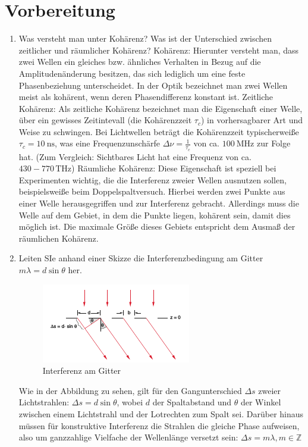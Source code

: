 \section{Vorbereitung}
\begin{enumerate}
	\item Was versteht man unter Kohärenz? Was ist der Unterschied zwischen zeitlicher und räumlicher Kohärenz?
		\subitem Kohärenz: Hierunter versteht man, dass zwei Wellen ein gleiches bzw. ähnliches Verhalten in Bezug auf die Amplitudenänderung besitzen, das sich lediglich um eine feste Phasenbeziehung unterscheidet. In der Optik bezeichnet man zwei Wellen meist als kohärent, wenn deren Phasendifferenz konstant ist.
		\subitem Zeitliche Kohärenz: Als zeitliche Kohärenz bezeichnet man die Eigenschaft einer Welle, über ein gewisses Zeitintevall (die Kohärenzzeit $\tau_c$) in vorhersagbarer Art und Weise zu schwingen. Bei Lichtwellen beträgt die Kohärenzzeit typischerweiße $\tau_c=\SI{10}{\nano\second}$, was eine Frequenzunschärfe $\Delta\nu=\frac{1}{\tau_c}$ von ca. $\SI{100}{\mega\hertz}$ zur Folge hat. (Zum Vergleich: Sichtbares Licht hat eine Frequenz von ca. $430-770\,\si{\tera\hertz}$)
		\subitem Räumliche Kohärenz: Diese Eigenschaft ist speziell bei Experimenten wichtig, die die Interferenz zweier Wellen ausnutzen sollen, beispielsweiße beim Doppelspaltversuch. Hierbei werden zwei Punkte aus einer Welle herausgegriffen und zur Interferenz gebracht. Allerdings muss die Welle auf dem Gebiet, in dem die Punkte liegen, kohärent sein, damit dies möglich ist. Die maximale Größe dieses Gebiets entspricht dem Ausmaß der räumlichen Kohärenz.
	\item Leiten SIe anhand einer Skizze die Interferenzbedingung am Gitter $m\lambda=d\sin\theta$ her. 
		\subitem \begin{figure}[!hb]
			\centering
			\includegraphics[]{interferenz}
			\caption{Interferenz am Gitter}
			\label{fig:Abb1}
		\end{figure}
		Wie in der Abbildung zu sehen, gilt für den Gangunterschied $\Delta s$ zweier Lichtstrahlen: $\Delta s=d\sin\theta$, wobei $d$ der Spaltabstand und $\theta$ der Winkel zwischen einem Lichtstrahl und der Lotrechten zum Spalt sei.
		Darüber hinaus müssen für konstruktive Interferenz die Strahlen die gleiche Phase aufweisen, also um ganzzahlige Vielfache der Wellenlänge versetzt sein: $\Delta s=m\lambda, m\in\mathbb{Z}$
		

\end{enumerate}
